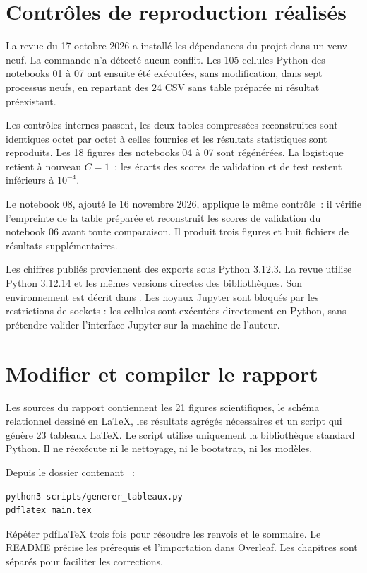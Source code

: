 \section{Contrôles de reproduction réalisés}
La revue du 17 octobre 2026 a installé les dépendances du projet dans un venv
neuf. La commande  n'a détecté aucun conflit. Les 105 cellules Python
 des notebooks 01 à 07 ont ensuite été exécutées, sans modification, dans sept processus
neufs, en repartant des 24 CSV sans table préparée ni résultat préexistant.

Les contrôles internes passent, les deux tables compressées reconstruites sont
identiques octet par octet à celles fournies et les résultats statistiques sont
reproduits. Les 18 figures des notebooks 04 à 07 sont régénérées. La logistique retient
à nouveau $C=1$~; les écarts des scores de validation et de test restent inférieurs
à $10^{-4}$.

Le notebook 08, ajouté le 16 novembre 2026, applique le même contrôle~: il vérifie
l'empreinte de la table préparée et reconstruit les scores de validation du notebook 06
avant toute comparaison. Il produit trois figures et huit fichiers de résultats
supplémentaires.

Les chiffres publiés proviennent des exports sous Python 3.12.3. La revue utilise
Python 3.12.14 et les mêmes versions directes des bibliothèques. Son environnement est
décrit dans . Les noyaux Jupyter sont bloqués
par les restrictions de sockets : les cellules sont exécutées directement en Python,
sans prétendre valider l'interface Jupyter sur la machine de l'auteur.

\section{Modifier et compiler le rapport}
Les sources du rapport contiennent les 21 figures scientifiques, le schéma relationnel
 dessiné en LaTeX, les résultats agrégés nécessaires et un script qui génère 23 tableaux
LaTeX. Le script utilise uniquement la bibliothèque standard Python. Il ne réexécute
ni le nettoyage, ni le bootstrap, ni les modèles.

Depuis le dossier contenant ~:
\begin{verbatim}
python3 scripts/generer_tableaux.py
pdflatex main.tex
\end{verbatim}
Répéter pdfLaTeX trois fois pour résoudre les renvois et le sommaire. Le README
précise les prérequis et l'importation dans Overleaf. Les chapitres sont séparés
pour faciliter les corrections.
\FloatBarrier
